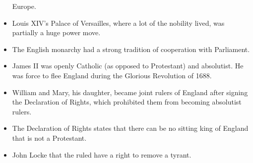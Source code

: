 \documentclass{article}
\begin{document}
\begin{spacing}{1.2}
\begin{itemize}
            Europe.
        \item Louis XIV's Palace of Versailles, where a lot of the nobility
            lived, was partially a huge power move.
        \item The English monarchy had a strong tradition of cooperation with
            Parliament.
        \item James II was openly Catholic (as opposed to Protestant) and
            absolutist. He was force to flee England during the Glorious
            Revolution of 1688.
        \item William and Mary, his daughter, became joint rulers of England
            after signing the Declaration of Rights, which prohibited them from
            becoming absolutist rulers.
        \item The Declaration of Rights states that there can be no sitting king
            of England that is not a Protestant.
        \item John Locke that the ruled have a right to remove a tyrant.
    \end{itemize}

\end{spacing}
\end{document}
